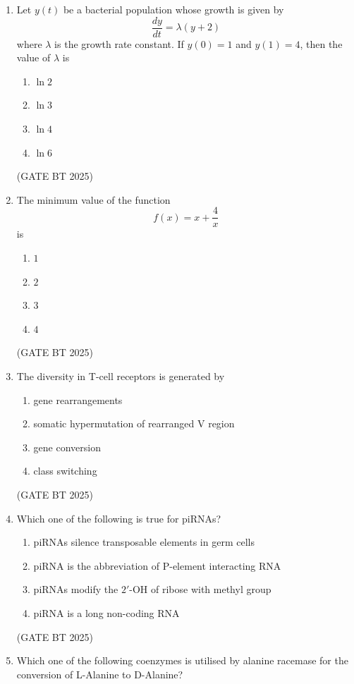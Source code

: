 \documentclass[journal,12pt,onecolumn]{IEEEtran}
\theoremstyle{remark}
\begin{document}
\begin{enumerate}
\item Let $y(t)$ be a bacterial population whose growth is given by  
\[
\frac{dy}{dt} = \lambda (y + 2)
\]  
where $\lambda$ is the growth rate constant. If $y(0) = 1$ and $y(1) = 4$, then the value of $\lambda$ is  

\begin{enumerate}
    \item $\ln 2$
    \item $\ln 3$
    \item $\ln 4$
    \item $\ln 6$
\end{enumerate}  
\hfill (GATE BT 2025)

\item The minimum value of the function  
\[
f(x) = x + \frac{4}{x} 
\]  
is  

\begin{enumerate}
    \item $1$
    \item $2$
    \item $3$
    \item $4$
\end{enumerate}  
\hfill (GATE BT 2025)

\item The diversity in T-cell receptors is generated by  

\begin{enumerate}
    \item gene rearrangements
    \item somatic hypermutation of rearranged V region
    \item gene conversion
    \item class switching
\end{enumerate}  
\hfill (GATE BT 2025)

\item Which one of the following is true for piRNAs?  

\begin{enumerate}
    \item piRNAs silence transposable elements in germ cells
    \item piRNA is the abbreviation of P-element interacting RNA
    \item piRNAs modify the $2'$-OH of ribose with methyl group
    \item piRNA is a long non-coding RNA
\end{enumerate}  
\hfill (GATE BT 2025)

\item Which one of the following coenzymes is utilised by alanine racemase for the conversion of L-Alanine to D-Alanine?  


\end{enumerate}
\end{document}
